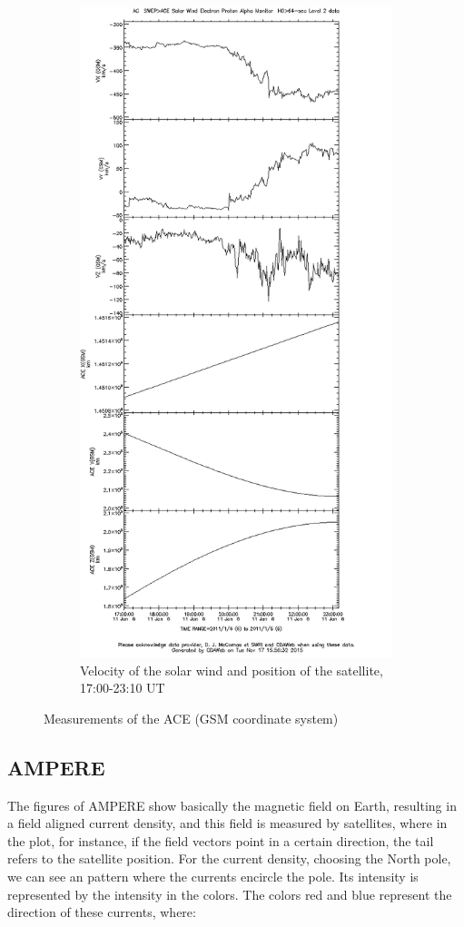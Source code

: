 \documentclass[10pt,a4paper]{article}
\begin{document}
\begin{figure}[h]
\begin{subfigure}[h]{.5\textwidth}
		\includegraphics[width=.8\linewidth]{ace-17-2310-v-s.png}
		\caption{Velocity of the solar wind and position of the satellite, 17:00-23:10 UT}
		\label{ace3}
	\end{subfigure}
	\caption{Measurements of the ACE (GSM coordinate system)}
	\label{ace}
\end{figure}


\subsection{AMPERE}

The figures of AMPERE show basically the magnetic field on Earth, resulting in a field aligned current density,  and this field is measured by satellites, where in the plot, for instance, if the field vectors point in a certain direction, the tail refers to the satellite position.
For the current density, choosing the North pole, we can see an pattern where the currents encircle the pole. Its intensity is represented by the intensity in the colors. The colors red and blue represent the direction of these currents, where:
\end{document}
